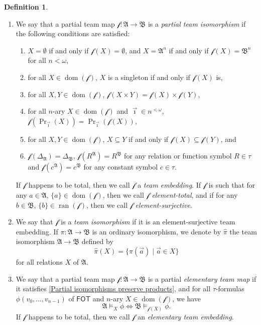 \documentclass[a4paper]{amsart}
\theoremstyle{definition}
\newtheorem{definition}{Definition}[section]
\theoremstyle{remark}
\newcommand{\A}{\mathcal{A}}
\newcommand{\B}{\mathcal{B}}
\DeclareMathOperator{\dom}{dom}
\DeclareMathOperator{\ran}{ran}
\newcommand\fot{\mathsf{FOT}}
\theoremstyle{definition}
\renewcommand{\A}{\mathfrak{A}}
\renewcommand{\B}{\mathfrak{B}}
\newcommand{\f}{\mathcal{f}}
\begin{document}
\begin{definition}
\begin{enumerate}
        \item We say that a partial team map $\f\colon\A\to\B$ is a \emph{partial team isomorphism} if the following conditions are satisfied:
        \begin{enumerate}[label=(PI\arabic*)]
            \item\label{Partial isomorphisms preserve bottom and top}
            $X = \emptyset$ if and only if $\f(X) = \emptyset$, and $X=\A^n$ if and only if $\f(X) = \B^n$ for all $n<\omega$,
            \item\label{Partial isomorphisms preserve atoms}
            for all $X\in\dom(\f)$, $X$ is a singleton if and only if $\f(X)$ is,
            \item\label{Partial isomorphisms preserve products}
            for all $X,Y\in\dom(\f)$, $\f(X\times Y) = \f(X)\times\f(Y)$,
            \item\label{Partial isomorphisms preserve projections}
            for all $n$-ary $X\in\dom(\f)$ and $\vec\imath\in n^{<\omega}$, $\f(\Pr_{\vec\imath}(X)) = \Pr_{\vec\imath}(\f(X))$,
            \item\label{Partial isomorphisms preserve order}
            for all $X,Y\in\dom(\f)$, $X\subseteq Y$ if and only if $\f(X)\subseteq\f(Y)$, and
            \item\label{Partial isomorphisms preserve structure}
            $\f(\Delta_\A) = \Delta_\B$, $\f(R^\A) = R^\B$ for any relation or function symbol $R\in\tau$ and $\f(c^\A) = c^\B$ for any constant symbol $c\in\tau$.
        \end{enumerate}
        If $\f$ happens to be total, then we call $\f$ a \emph{team embedding}. If $\f$ is such that for any $a\in\A$, $\{a\}\in\dom(\f)$, then we call $\f$ \emph{element-total}, and if for any $b\in\B$, $\{b\}\in\ran(\f)$, then we call $\f$ \emph{element-surjective}.

        \item We say that $\f$ is a \emph{team isomorphism} if it is an element-surjective team embedding. If $\pi\colon\A\to\B$ is an ordinary isomorphism, we denote by $\hat\pi$ the team isomorphism $\A\to\B$ defined by
        \[
            \hat\pi(X) = \{ \pi(\vec a) \mid \vec a\in X \}
        \]
        for all relations $X$ of $\A$.


        \item We say that a partial team map $\f\colon\A\to\B$ is a partial \emph{elementary team map} if it satisfies \ref{Partial isomorphisms preserve products}, and for all $\tau$-formulas $\phi(v_0,\dots,v_{n-1})$ of $\fot$ and $n$-ary $X\in\dom(\f)$, we have
        \[
            \A\models_X\phi \iff \B\models_{\f(X)}\phi.
        \]
        If $\f$ happens to be total, then we call $\f$ an \emph{elementary team embedding}.


\end{enumerate}
\end{definition}
\end{document}
